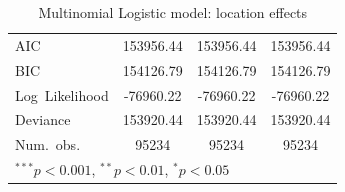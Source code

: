 \documentclass[12pt,twoside]{reedthesis}
\begin{document}
\begin{table}
\begin{center}
\begin{footnotesize}
\begin{tabular}{l c c c }
  \hline
  AIC                          & 153956.44              & 153956.44              & 153956.44              \\
  BIC                          & 154126.79              & 154126.79              & 154126.79              \\
  Log\ Likelihood              & -76960.22              & -76960.22              & -76960.22              \\
  Deviance                     & 153920.44              & 153920.44              & 153920.44              \\
  Num.\ obs.                   & 95234                  & 95234                  & 95234                  \\
  \hline
  \multicolumn{4}{l}{\tiny{$^{***}p<0.001$, $^{**}p<0.01$, $^*p<0.05$}}
  \end{tabular}
  \end{footnotesize}
  \caption{Multinomial Logistic model: location effects}
  \label{table:coefficients}
  \end{center}
  \end{table}
  
\end{document}
